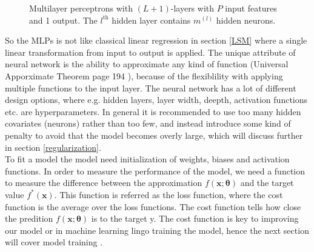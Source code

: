 \begin{figure}[th]
	\caption[Multilayer perceptrons with $(L+1)$-layers]{Multilayer perceptrons with $(L+1)$-layers with $P$ input features and 1 output. The $l^{\text{th}}$ hidden layer contains $m^{(l)}$ hidden neurons.}
	\label{fig:multilayer-perceptron}
\end{figure}

So the MLPs is not like classical linear regression in section \ref{LSM} where a single linear transformation from input to output is applied. The unique attribute of neural network is the ability to approximate any kind of function (Universal Apporximate Theorem page 194 \parencite{Goodfellow-et-al-2016}), because of the flexiblility with applying multiple functions to the input layer. The neural network has a lot of different design options, where e.g. hidden layers, layer width, deepth, activation functions etc. are hyperparameters. In general it is recommended to use too many hidden covariates (neurons) rather than too few, and instead introduce some kind of penalty to avoid that the model becomes overly large, which will discuss further in section \ref{regularization}.\\

To fit a model the model need initialization of weights, biases and activation functions. In order to measure the performance of the model, we need a function to measure the difference between the approximation $f(\bm{x};\bm{\theta})$ and the target value $f^*(\bm{x})$. This function is referred as the loss function, where the cost function is the average over the loss functions. The cost function tells how close the predition $f(\bm{x};\bm{\theta})$ is to the target y. The cost function is key to improving our model or in machine learning lingo training the model, hence the next section will cover model training \parencite{Goodfellow-et-al-2016}.

